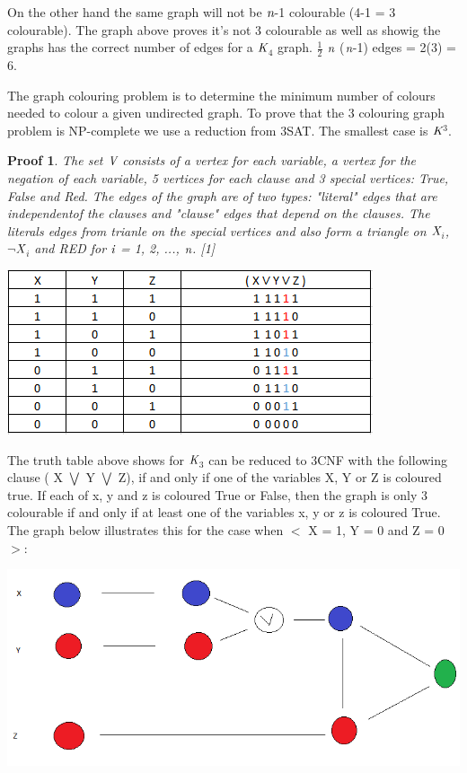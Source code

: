 \documentclass[a4paper]{report}
\newtheorem{myproof}{Proof}
\begin{document}
\vspace{3mm}
On the other hand the same graph will not be $\emph{n}$-1 colourable (4-1 = 3 colourable). The graph above proves it's not 3 colourable as well as showig the graphs has the correct number of edges for a $\emph{K}$$_{4}$ graph. $\frac{1}{2}$ $\emph{n}$ ($\emph{n}$-1) edges = 2(3) = 6.

\vspace{3mm}

The graph colouring problem is to determine the minimum number of colours needed to colour a given undirected graph. To prove that the 3 colouring graph problem is NP-complete we use a reduction from 3SAT. The smallest case is $\emph{K}$$^{3}$. 

\begin{myproof}
The set $\emph{V}$ consists of a vertex for each variable, a vertex for the negation of each variable, 5 vertices for each clause and 3 special vertices: True, False and Red. The edges of the graph are of two types: "literal" edges that are independentof the clauses and "clause" edges that depend on the clauses. The literals edges from trianle on the special vertices and also form a triangle on $\emph{X}$$_{i}$, $\neg$$\emph{X}$$_{i}$ and RED for $\emph{i}$ = 1, 2, ..., $\emph{n}$. [1] 
\end{myproof}

\begin{center}
\includegraphics[scale=0.60]{truthtable2.png}
\end{center}

The truth table above shows for $\emph{K}$$_{3}$ can be reduced to 3CNF with the following clause ( X $\bigvee$ Y $\bigvee$ Z), if and only if one of the variables X, Y or Z is coloured true. If each of x, y and z is coloured True or False, then the graph is only 3 colourable if and only if at least one of the variables x, y or z is coloured True. The graph below illustrates this for the case when $<$ X = 1, Y = 0 and Z = 0 $>$:

\begin{center}
\includegraphics[scale=0.60]{graph1.png}
\end{center}
\end{document}

